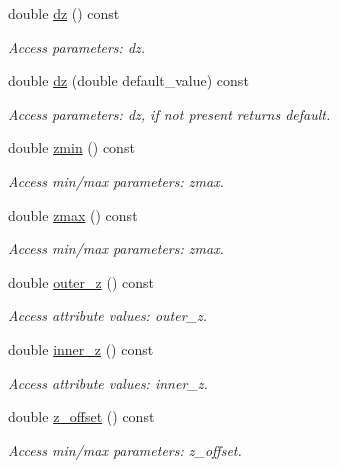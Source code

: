 \begin{DoxyCompactItemize}
double \hyperlink{struct_d_d4hep_1_1_x_m_l_1_1_child_value_a71f93a02d9809eb0f5861bee1e7288e6}{dz} () const
\begin{DoxyCompactList}\small\item\em Access parameters\+: dz. \end{DoxyCompactList}\item 
double \hyperlink{struct_d_d4hep_1_1_x_m_l_1_1_child_value_a5ea7509ecd0752970a6f1f4a5d352524}{dz} (double default\+\_\+value) const
\begin{DoxyCompactList}\small\item\em Access parameters\+: dz, if not present returns default. \end{DoxyCompactList}\item 
double \hyperlink{struct_d_d4hep_1_1_x_m_l_1_1_child_value_a2dcf57fce252cf96bdd7bc3372039a02}{zmin} () const
\begin{DoxyCompactList}\small\item\em Access min/max parameters\+: zmax. \end{DoxyCompactList}\item 
double \hyperlink{struct_d_d4hep_1_1_x_m_l_1_1_child_value_a17611f7d94bd97fc62ad6feffc9e8446}{zmax} () const
\begin{DoxyCompactList}\small\item\em Access min/max parameters\+: zmax. \end{DoxyCompactList}\item 
double \hyperlink{struct_d_d4hep_1_1_x_m_l_1_1_child_value_a4336a60a7568044f7e43183e4fe9ab87}{outer\+\_\+z} () const
\begin{DoxyCompactList}\small\item\em Access attribute values\+: outer\+\_\+z. \end{DoxyCompactList}\item 
double \hyperlink{struct_d_d4hep_1_1_x_m_l_1_1_child_value_a53f8d5ae142b86a53e161c1e16045d6f}{inner\+\_\+z} () const
\begin{DoxyCompactList}\small\item\em Access attribute values\+: inner\+\_\+z. \end{DoxyCompactList}\item 
double \hyperlink{struct_d_d4hep_1_1_x_m_l_1_1_child_value_a07ac9b1aa9a24713985e6ddd85a69fbe}{z\+\_\+offset} () const
\begin{DoxyCompactList}\small\item\em Access min/max parameters\+: z\+\_\+offset. \end{DoxyCompactList}\item 

\end{DoxyCompactItemize}
